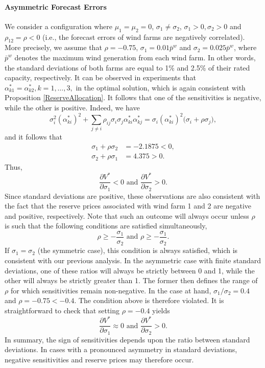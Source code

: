 \documentclass{article}
\begin{document}
\paragraph{Asymmetric Forecast Errors} We consider a configuration where $\mu_1 = \mu_2 = 0$, $\sigma_1 \ne \sigma_2$, $\sigma_1 > 0, \sigma_2 > 0$ and $\rho_{12} = \rho < 0$ (i.e., the forecast errors of wind farms are negatively correlated). More precisely, we assume that $\rho = -0.75$, $\sigma_1 = 0.01 \bar{p}^w$ and $\sigma_2 = 0.025 \bar{p}^w$, where $\bar{p}^w$ denotes the maximum wind generation from each wind farm. In other words, the standard deviations of both farms are equal to 1\% and 2.5\% of their rated capacity, respectively. It can be observed in experiments that $\alpha_{k1}^* = \alpha_{k2}^*, k = 1, \ldots, 3,$ in the optimal solution, which is again consistent with Proposition \ref{ReserveAllocation}. It follows that one of the sensitivities is negative, while the other is positive. Indeed, we have
\begin{equation*}
\sigma_i^2 (\alpha_{ki}^*)^2 + \sum_{j \ne i} \rho_{ij} \sigma_i \sigma_j \alpha_{ki}^* \alpha_{kj}^* = \sigma_i (\alpha_{ki}^*)^2 \big( \sigma_i + \rho \sigma_j \big),
\end{equation*}
and it follows that
\begin{align*}
\sigma_1 + \rho \sigma_2 &= -2.1875 < 0,\\
\sigma_2 + \rho \sigma_1 &= 4.375 > 0.
\end{align*}
Thus, 
\begin{equation*}
\frac{\partial V^*}{\partial \sigma_1} < 0 \mbox{ and } \frac{\partial V^*}{\partial \sigma_2} > 0.
\end{equation*}
Since standard deviations are positive, these observations are also consistent with the fact that the reserve prices associated with wind farm 1 and 2 are negative and positive, respectively. Note that such an outcome will always occur unless $\rho$ is such that the following conditions are satisfied simultaneously, 
\begin{equation*}
\rho \ge -\frac{\sigma_1}{\sigma_2} \mbox{ and } \rho \ge -\frac{\sigma_1}{\sigma_2}.
\end{equation*}
If $\sigma_1 = \sigma_2$ (the symmetric case), this condition is always satisfied, which is consistent with our previous analysis. In the asymmetric case with finite standard deviations, one of these ratios will always be strictly between 0 and 1, while the other will always be strictly greater than 1. The former then defines the range of $\rho$ for which sensitivities remain non-negative. In the case at hand, $\sigma_1/\sigma_2 = 0.4$ and $\rho = -0.75 < -0.4$. The condition above is therefore violated. It is straightforward to check that setting $\rho = -0.4$ yields
\begin{equation*}
\frac{\partial V^*}{\partial \sigma_1} \approx 0 \mbox{ and } \frac{\partial V^*}{\partial \sigma_2} > 0.
\end{equation*}
In summary, the sign of sensitivities depends upon the ratio between standard deviations. In cases with a pronounced asymmetry in standard deviations, negative sensitivities and reserve prices may therefore occur.
\end{document}
